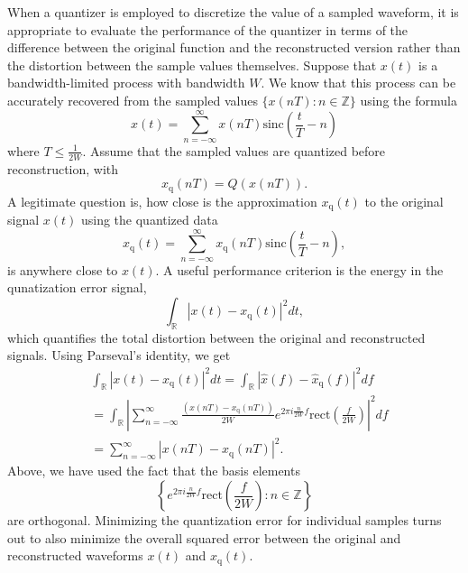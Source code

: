 When a quantizer is employed to discretize the value of a sampled waveform, it is appropriate to evaluate the performance of the quantizer in terms of the difference between the original function and the reconstructed version rather than the distortion between the sample values themselves.
Suppose that $x(t)$ is a bandwidth-limited process with bandwidth $W$.
We know that this process can be accurately recovered from the sampled values $\{ x(nT) : n \in \mathbb{Z} \}$ using the formula
\begin{equation*}
x(t) = \sum_{n = -\infty}^{\infty} x(nT) \mathrm{sinc} \left( \frac{t}{T} - n \right)
\end{equation*}
where $T \leq \frac{1}{2W}$.
Assume that the sampled values are quantized before reconstruction, with
\begin{equation*}
x_{\mathrm{q}} (nT) = Q ( x(nT) ) .
\end{equation*}
A legitimate question is, how close is the approximation $x_{\mathrm{q}}(t)$ to the original signal $x(t)$ using the quantized data
\begin{equation*}
x_{\mathrm{q}}(t) = \sum_{n = -\infty}^{\infty} x_{\mathrm{q}}(nT) \mathrm{sinc} \left( \frac{t}{T} - n \right) ,
\end{equation*}
is anywhere close to $x(t)$.
A useful performance criterion is the energy in the qunatization error signal,
\begin{equation*}
\int_{\mathbb{R}} \left| x(t) - x_{\mathrm{q}} (t) \right|^2 dt ,
\end{equation*}
which quantifies the total distortion between the original and reconstructed signals.
Using Parseval's identity, we get
\begin{equation*}
\begin{split}
&\int_{\mathbb{R}} \left|  x(t) - x_{\mathrm{q}} (t) \right|^2 dt
= \int_{\mathbb{R}} \left| \hat{x} (f) - \hat{x}_{\mathrm{q}} (f) \right|^2 df \\
&= \int_{\mathbb{R}} \left| \sum_{n = -\infty}^{\infty}
\frac{\left( x(nT) - x_{\mathrm{q}}(nT) \right)}{2W} e^{2 \pi i \frac{n}{2 W} f}
\mathrm{rect} \left( \frac{f}{2W} \right) \right|^2 df \\
&= \sum_{n = -\infty}^{\infty}
| x(nT) - x_{\mathrm{q}}(nT) |^2 .
\end{split}
\end{equation*}
Above, we have used the fact that the basis elements
\begin{equation*}
\left\{ e^{2 \pi i \frac{n}{2 W} f} \mathrm{rect} \left( \frac{f}{2W} \right) : n \in \mathbb{Z} \right\}
\end{equation*}
are orthogonal.
Minimizing the quantization error for individual samples turns out to also minimize the overall squared error between the original and reconstructed waveforms $x(t)$ and $x_{\mathrm{q}}(t)$.



